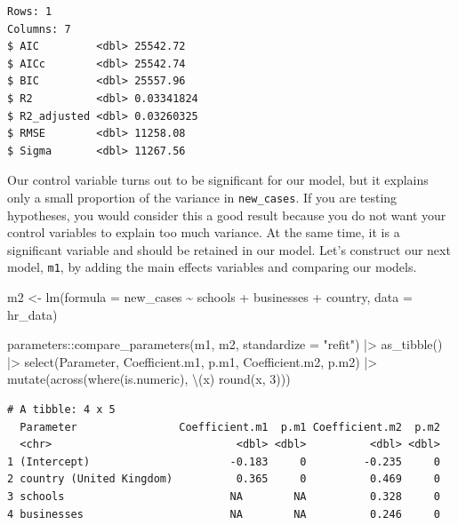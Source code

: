 \documentclass[
  letterpaper,
]{krantz}
\makeatletter
\newenvironment{Shaded}{\begin{snugshade}}{\end{snugshade}}
\newcommand{\AttributeTok}[1]{\textcolor[rgb]{0.40,0.45,0.13}{#1}}
\newcommand{\DecValTok}[1]{\textcolor[rgb]{0.68,0.00,0.00}{#1}}
\newcommand{\FunctionTok}[1]{\textcolor[rgb]{0.28,0.35,0.67}{#1}}
\newcommand{\NormalTok}[1]{\textcolor[rgb]{0.00,0.23,0.31}{#1}}
\newcommand{\OtherTok}[1]{\textcolor[rgb]{0.00,0.23,0.31}{#1}}
\newcommand{\SpecialCharTok}[1]{\textcolor[rgb]{0.37,0.37,0.37}{#1}}
\newcommand{\StringTok}[1]{\textcolor[rgb]{0.13,0.47,0.30}{#1}}
\newenvironment{kframe}{%
\medskip{}
\setlength{\fboxsep}{.8em}
 \def\at@end@of@kframe{}%
 \ifinner\ifhmode%
  \def\at@end@of@kframe{\end{minipage}}%
  \begin{minipage}{\columnwidth}%
 \fi\fi%
 \def\FrameCommand##1{\hskip\@totalleftmargin \hskip-\fboxsep
 \colorbox{shadecolor}{##1}\hskip-\fboxsep
     \hskip-\linewidth \hskip-\@totalleftmargin \hskip\columnwidth}%
 \MakeFramed {\advance\hsize-\width
   \@totalleftmargin\z@ \linewidth\hsize
   \@setminipage}}%
 {\par\unskip\endMakeFramed%
 \at@end@of@kframe}
\renewenvironment{Shaded}{\begin{kframe}}{\end{kframe}}
\makeatother
\begin{document}
\begin{verbatim}
Rows: 1
Columns: 7
$ AIC         <dbl> 25542.72
$ AICc        <dbl> 25542.74
$ BIC         <dbl> 25557.96
$ R2          <dbl> 0.03341824
$ R2_adjusted <dbl> 0.03260325
$ RMSE        <dbl> 11258.08
$ Sigma       <dbl> 11267.56
\end{verbatim}

Our control variable turns out to be significant for our model, but it
explains only a small proportion of the variance in \texttt{new\_cases}.
If you are testing hypotheses, you would consider this a good result
because you do not want your control variables to explain too much
variance. At the same time, it is a significant variable and should be
retained in our model. Let's construct our next model, \texttt{m1}, by
adding the main effects variables and comparing our models.

\begin{Shaded}
\begin{Highlighting}[]
\NormalTok{m2 }\OtherTok{\textless{}{-}} \FunctionTok{lm}\NormalTok{(}\AttributeTok{formula =}\NormalTok{ new\_cases }\SpecialCharTok{\textasciitilde{}}
\NormalTok{           schools }\SpecialCharTok{+}
\NormalTok{           businesses }\SpecialCharTok{+}
\NormalTok{           country,}
         \AttributeTok{data =}\NormalTok{ hr\_data)}

\NormalTok{parameters}\SpecialCharTok{::}\FunctionTok{compare\_parameters}\NormalTok{(m1, m2, }\AttributeTok{standardize =} \StringTok{"refit"}\NormalTok{) }\SpecialCharTok{|\textgreater{}}
  \FunctionTok{as\_tibble}\NormalTok{() }\SpecialCharTok{|\textgreater{}}
  \FunctionTok{select}\NormalTok{(Parameter, Coefficient.m1, p.m1, Coefficient.m2, p.m2) }\SpecialCharTok{|\textgreater{}}
  \FunctionTok{mutate}\NormalTok{(}\FunctionTok{across}\NormalTok{(}\FunctionTok{where}\NormalTok{(is.numeric), \textbackslash{}(x) }\FunctionTok{round}\NormalTok{(x, }\DecValTok{3}\NormalTok{)))}
\end{Highlighting}
\end{Shaded}

\begin{verbatim}
# A tibble: 4 x 5
  Parameter                Coefficient.m1  p.m1 Coefficient.m2  p.m2
  <chr>                             <dbl> <dbl>          <dbl> <dbl>
1 (Intercept)                      -0.183     0         -0.235     0
2 country (United Kingdom)          0.365     0          0.469     0
3 schools                          NA        NA          0.328     0
4 businesses                       NA        NA          0.246     0
\end{verbatim}
\end{document}
